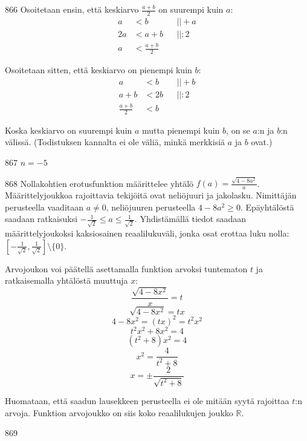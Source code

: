 \begin{Vastaus}{866}
	Osoitetaan ensin, että keskiarvo $\frac{a+b}{2}$ on suurempi kuin $a$:
	\begin{align*}
	a&<b && ||+a \\
	2a&<a+b && ||:2 \\
	a&<\frac{a+b}{2} &&
	\end{align*}

	Osoitetaan sitten, että keskiarvo on pienempi kuin $b$:
	\begin{align*}
	a&<b && ||+b \\
	a+b&<2b && ||:2 \\
	\frac{a+b}{2}&<b &&
	\end{align*}

	Koska keskiarvo on suurempi kuin $a$ mutta pienempi kuin $b$, on se $a$:n ja $b$:n välissä. (Todistuksen kannalta ei ole väliä, minkä merkkisiä $a$ ja $b$ ovat.)
	
\end{Vastaus}
\begin{Vastaus}{867}
	$n=-5$
	
\end{Vastaus}
\begin{Vastaus}{868}
	Nollakohtien erotusfunktion määrittelee yhtälö $f(a)=\frac{\sqrt{4-8a^2}}{a}$. Määrittelyjoukkoa rajoittavia tekijöitä ovat neliöjuuri ja jakolasku. Nimittäjän perusteella vaaditaan $a\neq 0$, neliöjuuren perusteella $4-8a^2\geq 0$. Epäyhtälöstä saadaan ratkaisuksi $-\frac{1}{\sqrt{2}}\leq a \leq \frac{1}{\sqrt{2}}$. Yhdistämällä tiedot saadaan määrittelyjoukoksi kaksiosainen reaalilukuväli, jonka osat erottaa luku nolla: $[-\frac{1}{\sqrt{2}},\frac{1}{\sqrt{2}}] \setminus \lbrace 0 \rbrace$. %

Arvojoukon voi päätellä asettamalla funktion arvoksi tuntematon $t$ ja ratkaisemalla yhtälöstä muuttuja $x$:
	$$\frac{\sqrt{4-8x^2}}{x}=t$$
	$$\sqrt{4-8x^2}=tx$$
	$$4-8x^2=(tx)^2=t^2x^2$$
	$$t^2x^2+8x^2=4$$
	$$(t^2+8)x^2=4$$
	$$x^2=\frac{4}{t^2+8}$$
	$$x=\pm \frac{2}{\sqrt{t^2+8}}$$

	Huomataan, että saadun lausekkeen perusteella ei ole mitään syytä rajoittaa $t$:n arvoja. Funktion arvojoukko on siis koko reaalilukujen joukko $\mathbb{R}$.
	
\end{Vastaus}
\begin{Vastaus}{869}
	
\end{Vastaus}
